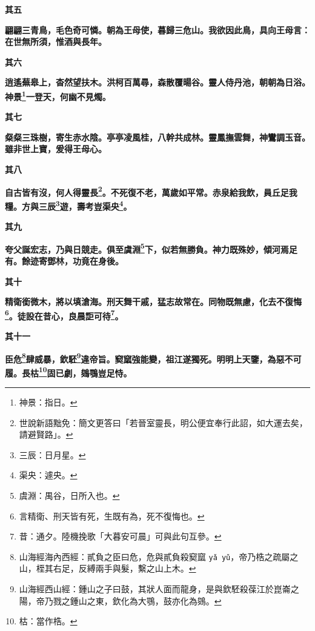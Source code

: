 \begin{quoting}\textbf{其五}\end{quoting}

\textbf{翩翩三青鳥，毛色奇可憐。朝為王母使，暮歸三危山。我欲因此鳥，具向王母言：在世無所須，惟酒與長年。}

\begin{quoting}\textbf{其六}\end{quoting}

\textbf{逍遙蕪皋上，杳然望扶木。洪柯百萬尋，森散覆暘谷。靈人侍丹池，朝朝為日浴。神景\footnote{神景：指日。}一登天，何幽不見燭。}

\begin{quoting}\textbf{其七}\end{quoting}

\textbf{粲粲三珠樹，寄生赤水陰。亭亭凌風桂，八幹共成林。靈鳳撫雲舞，神鸞調玉音。雖非世上寶，爰得王母心。}

\begin{quoting}\textbf{其八}\end{quoting}

\textbf{自古皆有沒，何人得靈長\footnote{世說新語黜免：簡文更答曰「若晉室靈長，明公便宜奉行此詔，如大運去矣，請避賢路」。}。不死復不老，萬歲如平常。赤泉給我飲，員丘足我糧。方與三辰\footnote{三辰：日月星。}遊，壽考豈渠央\footnote{渠央：遽央。}。}

\begin{quoting}\textbf{其九}\end{quoting}

\textbf{夸父誕宏志，乃與日競走。俱至虞淵\footnote{虞淵：禺谷，日所入也。}下，似若無勝負。神力既殊妙，傾河焉足有。餘迹寄鄧林，功竟在身後。}

\begin{quoting}\textbf{其十}\end{quoting}

\textbf{精衛銜微木，將以填滄海。刑天舞干戚，猛志故常在。同物既無慮，化去不復悔\footnote{言精衛、刑天皆有死，生既有為，死不復悔也。}。徒設在昔心，良晨詎可待\footnote{昔：通夕。陸機挽歌「大暮安可晨」可與此句互參。}。}

\begin{quoting}\textbf{其十一}\end{quoting}

\textbf{臣危\footnote{山海經海內西經：貳負之臣曰危，危與貳負殺窫窳 \texttt{yǎ yǔ}，帝乃梏之疏屬之山，桎其右足，反縛兩手與髮，繫之山上木。}肆威暴，欽駓\footnote{山海經西山經：鍾山之子曰鼓，其狀人面而龍身，是與欽駓殺葆江於崑崙之陽，帝乃戮之鍾山之東，欽化為大鶚，鼓亦化為鵕。}違帝旨。窫窳強能變，祖江遂獨死。明明上天鑒，為惡不可履。長枯\footnote{枯：當作梏。}固已劇，鵕鶚豈足恃。}


